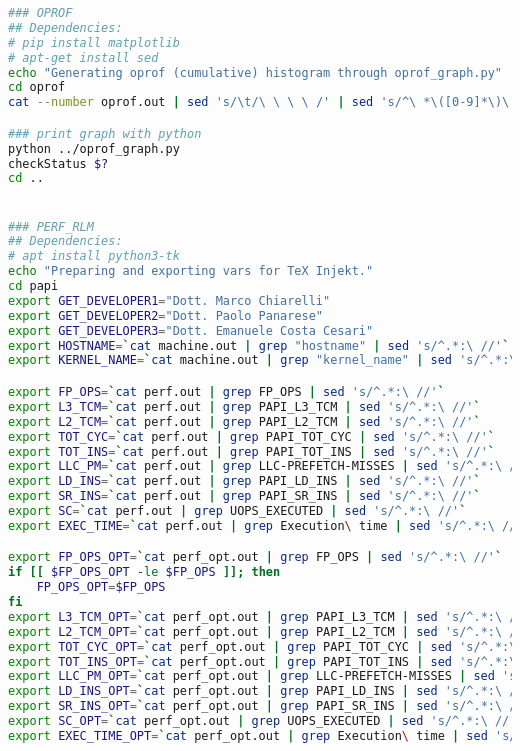 \begin{lstlisting}[language=bash,breaklines=true]
### OPROF
## Dependencies:
# pip install matplotlib
# apt-get install sed
echo "Generating oprof (cumulative) histogram through oprof_graph.py"
cd oprof
cat --number oprof.out | sed 's/\t/\ \ \ \ /' | sed 's/^\ *\([0-9]*\)\ *\([0-9]*\)\ *\([0-9]*\)\ */\1 \2 \3/' | grep ^[0-9]*\ [0-9]*\ [0-9.]*\ *: | sed 's/:.*//' > oprof_data

### print graph with python
python ../oprof_graph.py
checkStatus $?
cd ..


### PERF_RLM
## Dependencies:
# apt install python3-tk
echo "Preparing and exporting vars for TeX Injekt."
cd papi
export GET_DEVELOPER1="Dott. Marco Chiarelli"
export GET_DEVELOPER2="Dott. Paolo Panarese"
export GET_DEVELOPER3="Dott. Emanuele Costa Cesari"
export HOSTNAME=`cat machine.out | grep "hostname" | sed 's/^.*:\ //'`
export KERNEL_NAME=`cat machine.out | grep "kernel_name" | sed 's/^.*:\ //'`

export FP_OPS=`cat perf.out | grep FP_OPS | sed 's/^.*:\ //'`
export L3_TCM=`cat perf.out | grep PAPI_L3_TCM | sed 's/^.*:\ //'`
export L2_TCM=`cat perf.out | grep PAPI_L2_TCM | sed 's/^.*:\ //'`
export TOT_CYC=`cat perf.out | grep PAPI_TOT_CYC | sed 's/^.*:\ //'`
export TOT_INS=`cat perf.out | grep PAPI_TOT_INS | sed 's/^.*:\ //'`
export LLC_PM=`cat perf.out | grep LLC-PREFETCH-MISSES | sed 's/^.*:\ //'`
export LD_INS=`cat perf.out | grep PAPI_LD_INS | sed 's/^.*:\ //'`
export SR_INS=`cat perf.out | grep PAPI_SR_INS | sed 's/^.*:\ //'`
export SC=`cat perf.out | grep UOPS_EXECUTED | sed 's/^.*:\ //'`
export EXEC_TIME=`cat perf.out | grep Execution\ time | sed 's/^.*:\ //' | awk '{ sum += $1; n++ } END { if (n > 0) print sum / n; }'`

export FP_OPS_OPT=`cat perf_opt.out | grep FP_OPS | sed 's/^.*:\ //'`
if [[ $FP_OPS_OPT -le $FP_OPS ]]; then	
	FP_OPS_OPT=$FP_OPS
fi
export L3_TCM_OPT=`cat perf_opt.out | grep PAPI_L3_TCM | sed 's/^.*:\ //'`
export L2_TCM_OPT=`cat perf_opt.out | grep PAPI_L2_TCM | sed 's/^.*:\ //'`
export TOT_CYC_OPT=`cat perf_opt.out | grep PAPI_TOT_CYC | sed 's/^.*:\ //'`
export TOT_INS_OPT=`cat perf_opt.out | grep PAPI_TOT_INS | sed 's/^.*:\ //'`
export LLC_PM_OPT=`cat perf_opt.out | grep LLC-PREFETCH-MISSES | sed 's/^.*:\ //'`
export LD_INS_OPT=`cat perf_opt.out | grep PAPI_LD_INS | sed 's/^.*:\ //'`
export SR_INS_OPT=`cat perf_opt.out | grep PAPI_SR_INS | sed 's/^.*:\ //'`
export SC_OPT=`cat perf_opt.out | grep UOPS_EXECUTED | sed 's/^.*:\ //'`
export EXEC_TIME_OPT=`cat perf_opt.out | grep Execution\ time | sed 's/^.*:\ //' | awk '{ sum += $1; n++ } END { if (n > 0) print sum / n; }'`


\end{lstlisting}
